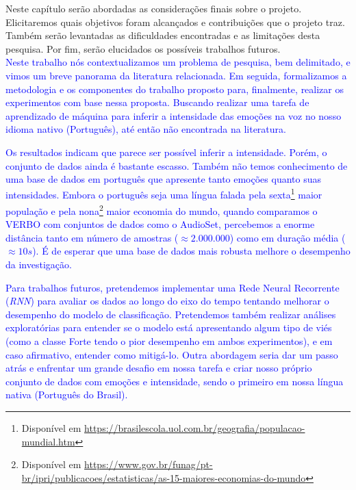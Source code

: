 
Neste capítulo serão abordadas as considerações finais sobre o projeto. Elicitaremos quais objetivos foram alcançados e contribuições que o projeto traz. Também serão levantadas as dificuldades encontradas e as limitações desta pesquisa. Por fim, serão elucidados os possíveis trabalhos futuros.\\

\textcolor{blue}{Neste trabalho nós contextualizamos um problema de pesquisa, bem delimitado, e vimos um breve panorama da literatura relacionada. Em seguida, formalizamos a metodologia e os componentes do trabalho proposto para, finalmente, realizar os experimentos com base nessa proposta. Buscando realizar uma tarefa de aprendizado de máquina para inferir a intensidade das emoções na voz no nosso idioma nativo (Português), até então não encontrada na literatura.}

\textcolor{blue}{Os resultados indicam que parece ser possível inferir a intensidade. Porém, o conjunto de dados ainda é bastante escasso. Também não temos conhecimento de uma base de dados em português que apresente tanto emoções quanto suas intensidades. Embora o português seja uma língua falada pela sexta\footnote{Disponível em \url{https://brasilescola.uol.com.br/geografia/populacao-mundial.htm}} maior população e pela nona\footnote{Disponível em \url {https://www.gov.br/funag/pt-br/ipri/publicacoes/estatisticas/as-15-maiores-economias-do-mundo}} maior economia do mundo, quando comparamos o VERBO com conjuntos de dados como o AudioSet, percebemos a enorme distância tanto em número de amostras ($\approx 2.000.000$) como em duração média ($\approx 10s$). É de esperar que uma base de dados mais robusta melhore o desempenho da investigação.}


\textcolor{blue}{Para trabalhos futuros, pretendemos implementar uma Rede Neural Recorrente (\textit{RNN}) para avaliar os dados ao longo do eixo do tempo tentando melhorar o desempenho do modelo de classificação. Pretendemos também realizar análises exploratórias para entender se o modelo está apresentando algum tipo de viés (como a classe Forte tendo o pior desempenho em ambos experimentos), e em caso afirmativo, entender como mitigá-lo. Outra abordagem seria dar um passo atrás e enfrentar um grande desafio em nossa tarefa e criar nosso próprio conjunto de dados com emoções e intensidade, sendo o primeiro em nossa língua nativa (Português do Brasil).}

